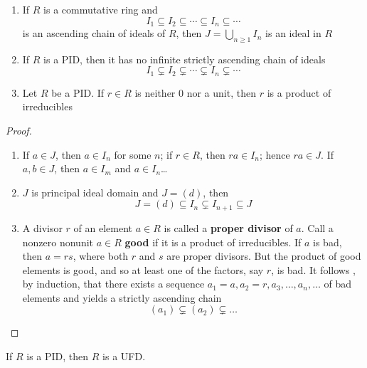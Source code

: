 \documentclass[11pt]{article}
\begin{document}
\begin{lemma}[]
\begin{enumerate}
\item If \(R\) is a commutative ring and
\begin{equation*}
I_1\subseteq I_2\subseteq\cdots\subseteq I_n\subseteq\cdots
\end{equation*}
is an ascending chain of ideals of \(R\), then \(J=\bigcup_{n\ge1}I_n\) is
an ideal in \(R\)
\item If \(R\) is a PID, then it has no infinite strictly ascending chain of
ideals 
\begin{equation*}
I_1\subsetneq I_2\subsetneq\cdots\subsetneq I_n\subsetneq\cdots
\end{equation*}
\item Let \(R\) be a PID. If \(r\in R\) is neither 0 nor a unit, then \(r\) is a
product of irreducibles
\end{enumerate}
\end{lemma}

\begin{proof}
\begin{enumerate}
\item If \(a\in J\), then \(a\in I_n\) for some \(n\); if \(r\in R\), then 
\(ra\in I_n\); hence \(ra\in J\). If \(a,b\in J\), then \(a\in I_m\) and 
\(a\in I_n\)\ldots{}
\item \(J\) is principal ideal domain and \(J=(d)\), then
\begin{equation*}
J=(d)\subseteq I_n\subsetneq I_{n+1}\subseteq J
\end{equation*}
\item A divisor \(r\) of an element \(a\in R\) is called a \textbf{proper divisor} of \(a\).
Call a nonzero nonunit \(a\in R\) \textbf{good} if it is a product of irreducibles.
If \(a\) is bad, then \(a=rs\), where both \(r\) and \(s\) are proper
divisors. But the product of good elements is good, and so at least one of
the factors, say \(r\), is bad. It follows , by induction, that there exists
a sequence \(a_1=a,a_2=r,a_3,\dots,a_n,\dots\) of bad elements and yields
a strictly ascending chain
\begin{equation*}
(a_1)\subsetneq(a_2)\subsetneq\dots
\end{equation*}
\end{enumerate}
\end{proof}

\begin{theorem}[]
If \(R\) is a PID, then \(R\) is a UFD.
\end{theorem}
\end{document}
